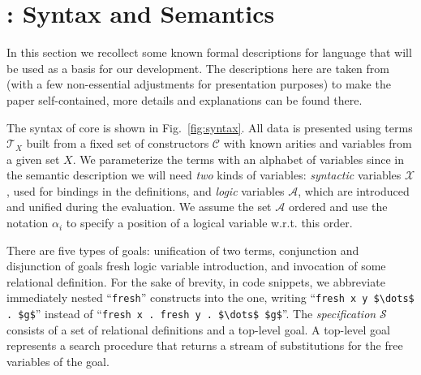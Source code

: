 \section{\mK: Syntax and Semantics}
\label{sec:background}

In this section we recollect some known formal descriptions for \mK language that will be used as a basis for our development.
The descriptions here are taken from~\cite{CertifiedSemantics} (with a few non-essential adjustments for presentation purposes) to make
the paper self-contained, more details and explanations can be found there.

The syntax of core \mK is shown in Fig.~\ref{fig:syntax}. 
All data is presented using terms $\mathcal{T}_X$ built from a fixed set of constructors $\mathcal{C}$ with known arities and variables
from a given set $X$.
We parameterize the terms with an alphabet of variables since in the semantic description we will need \emph{two} kinds of variables:
\emph{syntactic} variables $\mathcal{X}$, used for bindings in the definitions, and \emph{logic} variables $\mathcal{A}$, which are
introduced and unified during the evaluation. We assume the set $\mathcal{A}$ ordered and use the notation $\alpha_i$ 
to specify a position of a logical variable w.r.t. this order.

There are five types of goals: unification of two terms, conjunction and disjunction of goals
fresh logic variable introduction, and invocation of some relational definition. For the sake of brevity, in code snippets, we abbreviate
immediately nested ``\lstinline|fresh|'' constructs into the one, writing ``\lstinline|fresh x y $\dots$ . $g$|'' instead of
``\lstinline|fresh x . fresh y . $\dots$ $g$|''. The \emph{specification} $\mathcal{S}$ consists of a set of relational definitions and a top-level goal.
A top-level goal represents a search procedure that returns a stream of substitutions for the free variables of the goal.


